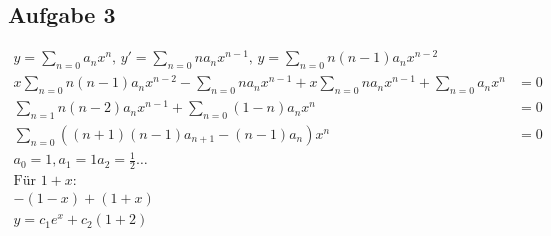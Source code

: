 \documentclass{article}
\begin{document}
\subsection*{Aufgabe 3}
\begin{align*}
    y = \sum_{n=0} a_nx^n,\,y' = \sum_{n=0} na_nx^{n-1},\,y = \sum_{n=0} n(n-1)a_nx^{n-2}\\
    x \sum_{n=0} n(n-1)a_nx^{n-2} - \sum_{n=0} na_nx^{n-1} + x \sum_{n=0} na_nx^{n-1}+\sum_{n=0} a_nx^n &= 0\\
    \sum_{n=1} n(n-2)a_nx^{n-1}+\sum_{n=0} (1-n) a_nx^n &=0\\
    \sum_{n=0} ((n+1)(n-1)a_{n+1}-(n-1)a_n)x^n &=0\\
    a_0 = 1, a_1 = 1 a_2 = \frac{1}{2}\dots\\
    \text{Für }1+x:\\
    -(1-x)+(1+x)\\
    y=c_1e^x+c_2(1+2)
\end{align*}
\end{document}
